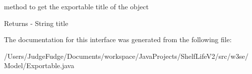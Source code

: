 method to get the exportable title of the object \begin{DoxyReturn}{Returns}
-\/ String title 
\end{DoxyReturn}


The documentation for this interface was generated from the following file\-:\begin{DoxyCompactItemize}
\item 
/\-Users/\-Judge\-Fudge/\-Documents/workspace/\-Java\-Projects/\-Shelf\-Life\-V2/src/w3se/\-Model/Exportable.\-java\end{DoxyCompactItemize}
